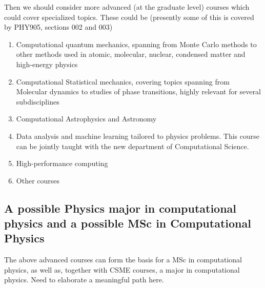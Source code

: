 \documentclass[%
oneside,                 %
final,                   %
10pt]{article}
\begin{document}
\noindent
Then we should consider more advanced (at the graduate level) courses which could cover specialized topics.
These could be (presently some of this is covered by PHY905, sections 002 and 003)
\begin{enumerate}
  \item Computational quantum mechanics, spanning from Monte Carlo methods to other methods used in atomic, molecular, nuclear, condensed matter and high-energy physics

  \item Computational Statistical mechanics, covering topics spanning from Molecular dynamics to studies of phase transitions, highly relevant for several subdisciplines

  \item Computational Astrophysics and Astronomy

  \item Data analysis and machine learning tailored to physics problems. This course can be jointly taught with the new department of Computational Science.

  \item High-performance computing

  \item Other courses
\end{enumerate}

\noindent
\subsection*{A possible Physics major in computational physics and a possible MSc in Computational Physics}

The above advanced courses can form the basis for a MSc in computational physics, as well as, together with 
CSME courses, a major in computational physics. Need to elaborate a meaningful path here. 


% 
% 


\end{document}
